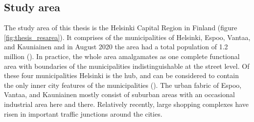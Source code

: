 \newpage
\subsection{Study area}
\justify









The study area of this thesis is the Helsinki Capital Region in Finland (figure \ref{fig:thesis_resarea}). It comprises of the municipalities of Helsinki, Espoo, Vantaa, and Kauniainen and in August 2020 the area had a total population of 1.2 million (\cite{StatisticsFinland2020a}). In practice, the whole area amalgamates as one complete functional area with boundaries of the municipalities indistinguishable at the street level. Of these four municipalities Helsinki is the hub, and can be considered to contain the only inner city features of the municipalities (\cite{FinnishEnvironmentInstitute2013}). The urban fabric of Espoo, Vantaa, and Kauniainen mostly consist of suburban areas with an occasional industrial area here and there. Relatively recently, large shopping complexes have risen in important traffic junctions around the cities. 

